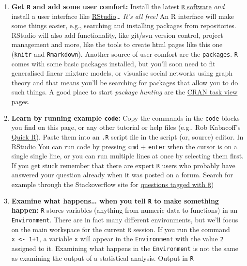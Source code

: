 \documentclass[]{book}
\begin{document}
\begin{enumerate}
\def\labelenumi{\arabic{enumi}.}
\item
  \textbf{Get \texttt{R} and add some user comfort:} Install the latest
  \href{http://www.r-project.org}{\texttt{R} software} \emph{and}
  install a user interface like
  \href{http://www.rstudio.com}{RStudio}\ldots{} \emph{It's all free!}
  An R interface will make some things easier, e.g., searching and
  installing packages from repositories. RStudio will also add
  functionality, like git/svn version control, project management and
  more, like the tools to create html pages like this one
  (\texttt{knitr} and \texttt{Rmarkdown}). Another source of user
  comfort are the \texttt{packages}. \texttt{R} comes with some basic
  packages installed, but you'll soon need to fit generalised linear
  mixture models, or visualise social networks using graph theory and
  that means you'll be searching for packages that allow you to do such
  things. A good place to start \emph{package hunting} are the
  \href{http://cran.r-project.org/web/views/}{CRAN task view} pages.
\item
  \textbf{Learn by running example \texttt{code}:} Copy the commands in
  the \texttt{code} blocks you find on this page, or any other tutorial
  or help files (e.g., Rob Kabacoff's
  \href{http://www.statmethods.net}{Quick R}). Paste them into an
  \texttt{.R} script file in the script (or, source) editor. In RStudio
  You can run code by pressing \texttt{cmd} + \texttt{enter} when the
  cursor is on a single single line, or you can run multiple lines at
  once by selecting them first. If you get stuck remember that there are
  expert \texttt{R} users who probably have answered your question
  already when it was posted on a forum. Search for example through the
  Stackoverflow site for
  \href{http://stackoverflow.com/questions/tagged/r}{questions tagged
  with \texttt{R}})
\item
  \textbf{Examine what happens\ldots{} when you tell \texttt{R} to make
  something happen:} \texttt{R} stores variables (anything from numeric
  data to functions) in an \texttt{Environment}. There are in fact many
  different environments, but we'll focus on the main workspace for the
  current \texttt{R} session. If you run the command
  \texttt{x\ \textless{}-\ 1+1}, a variable \texttt{x} will appear in
  the \texttt{Environment} with the value \texttt{2} assigned to it.
  Examining what happens in the \texttt{Environment} is not the same as
  examining the output of a statistical analysis. Output in \texttt{R}

\end{enumerate}
\end{document}
